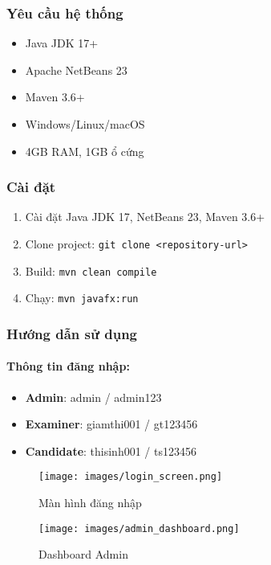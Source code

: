 \documentclass[12pt,a4paper]{article}
\begin{document}
\subsubsection{Yêu cầu hệ thống}

\begin{itemize}
    \item Java JDK 17+
    \item Apache NetBeans 23
    \item Maven 3.6+
    \item Windows/Linux/macOS
    \item 4GB RAM, 1GB ổ cứng
\end{itemize}

\subsubsection{Cài đặt}

\begin{enumerate}
    \item Cài đặt Java JDK 17, NetBeans 23, Maven 3.6+
    \item Clone project: \texttt{git clone <repository-url>}
    \item Build: \texttt{mvn clean compile}
    \item Chạy: \texttt{mvn javafx:run}
\end{enumerate}

\subsubsection{Hướng dẫn sử dụng}

\paragraph{Thông tin đăng nhập:}
\begin{itemize}
    \item \textbf{Admin}: admin / admin123
    \item \textbf{Examiner}: giamthi001 / gt123456  
    \item \textbf{Candidate}: thisinh001 / ts123456
\end{itemize}

\begin{figure}[H]
\centering
\texttt{[image: images/login\_screen.png]}
\caption{Màn hình đăng nhập}
\label{fig:login_screen}
\end{figure}

\begin{figure}[H]
\centering
\texttt{[image: images/admin\_dashboard.png]}
\caption{Dashboard Admin}
\label{fig:admin_dashboard}
\end{figure}
\end{document}
